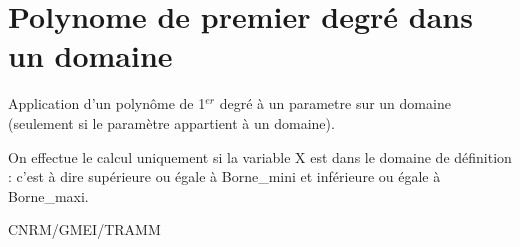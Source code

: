 %
\section{Polynome de premier degr\'e dans un domaine}

 

Application d'un polyn\^ome de 1$^{er}$ degr\'e
\`a un parametre sur un domaine (seulement si le param\`etre appartient \`a un domaine).

\bigskip





On effectue le calcul uniquement si la variable X est dans le domaine de d\'efinition :
 c'est \`a dire sup\'erieure ou \'egale \`a Borne\_mini et inf\'erieure ou \'egale \`a Borne\_maxi.

CNRM/GMEI/TRAMM

